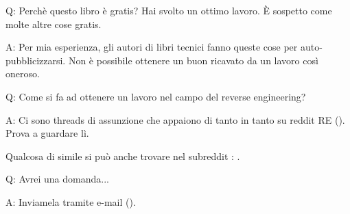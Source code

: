\par Q: Perchè questo libro è gratis? Hai svolto un ottimo lavoro. È sospetto come molte altre cose gratis.
\par A: Per mia esperienza, gli autori di libri tecnici fanno queste cose per auto-pubblicizzarsi. Non è possibile ottenere un buon ricavato da un lavoro così oneroso.

\par Q: Come si fa ad ottenere un lavoro nel campo del reverse engineering?
\par A: Ci sono threads di assunzione che appaiono di tanto in tanto su reddit RE\FNURLREDDIT{}
(\RedditHiringThread{}).
Prova a guardare lì.

Qualcosa di simile si può anche trovare nel subreddit : \NetsecHiringThread{}.

\par Q: Avrei una domanda...
\par A: Inviamela tramite e-mail (\EMAIL).
